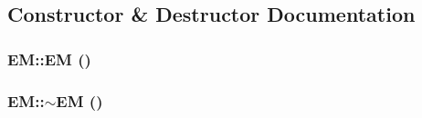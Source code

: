\subsection{Constructor \& Destructor Documentation}
\hypertarget{classEM_ab63fb999a41e57947ecd2e61c073c5ef}{
\subsubsection[{EM}]{\setlength{\rightskip}{0pt plus 5cm}EM::EM ()}}
\label{classEM_ab63fb999a41e57947ecd2e61c073c5ef}
\hypertarget{classEM_a5da3eaa0aa91b3925de2c5bca158faca}{
\subsubsection[{$\sim$EM}]{\setlength{\rightskip}{0pt plus 5cm}EM::$\sim$EM ()}}
\label{classEM_a5da3eaa0aa91b3925de2c5bca158faca}


